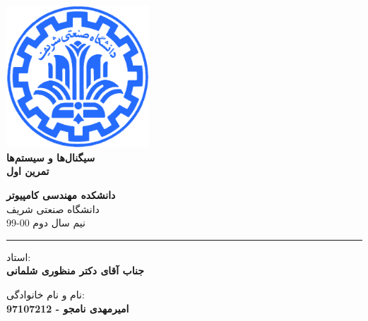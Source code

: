 \documentclass[12pt]{article}
\begin{document}
\begin{titlepage}
\begin{center}
        
\vspace*{0.7cm}

\includegraphics[width=0.4\textwidth]{sharif1.png}\\
\vspace{0.5cm}
\textbf{ \Huge{\emph ‌سیگنال‌ها و سیستم‌ها} }\\
\vspace{0.5cm}
\textbf{ \Large{ تمرین اول} }
\vspace{0.2cm}
       
 
      \large \textbf{دانشکده مهندسی کامپیوتر}\\\vspace{0.2cm}
    \large   دانشگاه صنعتی شریف\\\vspace{0.2cm}
       \large   ﻧﯿﻢ سال دوم 00-99 \\\vspace{0.2cm}
      \noindent\rule[1ex]{\linewidth}{1pt}
استاد:\\
    \textbf{{جناب آقای دکتر منظوری شلمانی}}


    \vspace{0.15cm}
نام و نام خانوادگی:\\

       
    \textbf{{امیرمهدی نامجو - 97107212}}
\end{center}
\end{titlepage}


\newpage
\pagestyle{fancy}
\fancyhf{}
\fancyfoot{}
\cfoot{\thepage}
\end{document}
